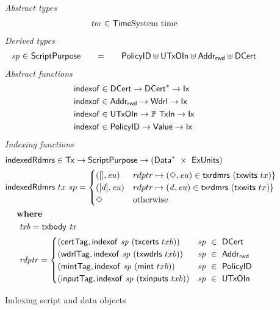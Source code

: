 \begin{figure}[htb]
  \emph{Abstract types}
  \begin{equation*}
    \begin{array}{r@{~\in~}l@{}lr}
      \var{tm}
      & \Time
      & \text{System time}
    \end{array}
  \end{equation*}
  \emph{Derived types}
  \begin{equation*}
    \begin{array}{r@{~\in~}l@{\qquad=\qquad}lr}
      \var{sp}
      & \ScriptPurpose
      & \PolicyID \uniondistinct \UTxOIn \uniondistinct \AddrRWD \uniondistinct \DCert
    \end{array}
  \end{equation*}
  \emph{Abstract functions}
  \begin{align*}
    &\mathsf{indexof} \in \mathsf{DCert} \to \mathsf{DCert}^{*} \to \mathsf{Ix}\\
    &\mathsf{indexof} \in \mathsf{Addr_{rwd}} \to \mathsf{Wdrl} \to \mathsf{Ix}\\
    &\mathsf{indexof} \in \mathsf{UTxOIn} \to \mathbb{P}~\mathsf{TxIn} \to \mathsf{Ix}\\
    &\mathsf{indexof} \in \mathsf{PolicyID} \to \mathsf{Value} \to \mathsf{Ix}
  \end{align*}
  \emph{Indexing functions}
  \begin{align*}
    &\mathsf{indexedRdmrs} \in \mathsf{Tx} \to \mathsf{ScriptPurpose} \to (\mathsf{Data}^{*}~\times~\mathsf{ExUnits})\\
    &\mathsf{indexedRdmrs}~tx~sp =
      \begin{cases}
        ([], \mathit{eu}) & rdptr \mapsto (\Diamond, \mathit{eu}) \in \mathsf{txrdmrs}~(\mathsf{txwits}~{tx}) \} \\
        ([d], \mathit{eu}) & rdptr \mapsto (\mathit{d}, \mathit{eu}) \in \mathsf{txrdmrs}~(\mathsf{txwits}~{tx}) \} \\
        \Diamond & \text{otherwise}
      \end{cases} \\
    & ~~~ ~ \mathbf{where}~ ~  \\
    & ~~\quad \mathit{txb} = \mathsf{txbody}~ \mathit{tx} \\
    & ~~\quad \mathit{rdptr} = \begin{cases}
        (\mathsf{certTag},\mathsf{indexof}~\mathit{sp}~(\mathsf{txcerts}~{txb}))   & \mathit{sp}~\in~\mathsf{DCert} \\
        (\mathsf{wdrlTag},\mathsf{indexof}~\mathit{sp}~(\mathsf{txwdrls}~{txb}))   & \mathit{sp}~\in~\mathsf{Addr_{rwd}} \\
        (\mathsf{mintTag},\mathsf{indexof}~\mathit{sp}~(\mathsf{mint}~{txb}))    & \mathit{sp}~\in~\mathsf{PolicyID} \\
        (\mathsf{inputTag},\mathsf{indexof}~\mathit{sp}~(\mathsf{txinputs}~{txb})) & \mathit{sp}~\in~\mathsf{UTxOIn}
      \end{cases}
  \end{align*}
  \caption{Indexing script and data objects}
  \label{fig:functions:script1}
\end{figure}


